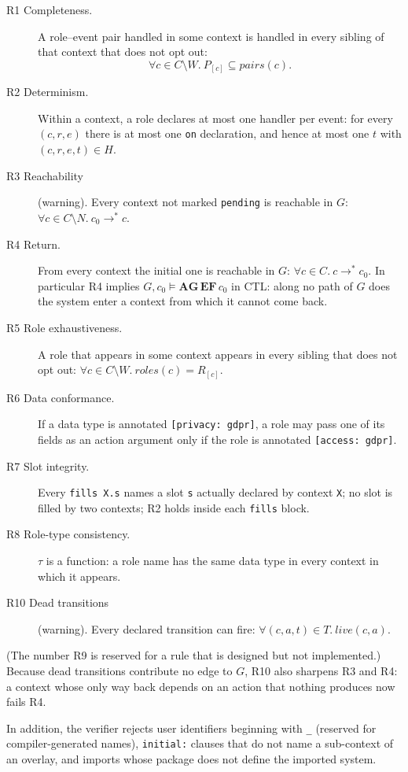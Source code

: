 \begin{description}
\item[R1 Completeness.] A role--event pair handled in some context is
  handled in every sibling of that context that does not opt out:
  \[ \forall c \in C \setminus W.\ P_{[c]} \subseteq \mathit{pairs}(c). \]
\item[R2 Determinism.] Within a context, a role declares at most one
  handler per event: for every $(c,r,e)$ there is at most one \texttt{on}
  declaration, and hence at most one $t$ with $(c,r,e,t) \in H$.
\item[R3 Reachability] (warning). Every context not marked
  \texttt{pending} is reachable in $G$:
  $\forall c \in C \setminus N.\ c_0 \to^{*} c$.
\item[R4 Return.] From every context the initial one is reachable in $G$:
  $\forall c \in C.\ c \to^{*} c_0$. In particular R4 implies
  $G, c_0 \models \mathbf{AG}\,\mathbf{EF}\, c_0$ in CTL: along no path
  of $G$ does the system enter a context from which it cannot come back.
\item[R5 Role exhaustiveness.] A role that appears in some context
  appears in every sibling that does not opt out:
  $\forall c \in C \setminus W.\ \mathit{roles}(c) = R_{[c]}$.
\item[R6 Data conformance.] If a data type is annotated
  \texttt{[privacy: gdpr]}, a role may pass one of its fields as an action
  argument only if the role is annotated \texttt{[access: gdpr]}.
\item[R7 Slot integrity.] Every \texttt{fills X.s} names a slot \texttt{s}
  actually declared by context \texttt{X}; no slot is filled by two
  contexts; R2 holds inside each \texttt{fills} block.
\item[R8 Role-type consistency.] $\tau$ is a function: a role name has the
  same data type in every context in which it appears.
\item[R10 Dead transitions] (warning). Every declared transition can fire:
  $\forall (c,a,t) \in T.\ \mathit{live}(c,a)$.
\end{description}
(The number R9 is reserved for a rule that is designed but not implemented.)
Because dead transitions contribute no edge to $G$, R10 also sharpens R3
and R4: a context whose only way back depends on an action that nothing
produces now fails R4.

In addition, the verifier rejects user identifiers beginning with
\texttt{\_} (reserved for compiler-generated names), \texttt{initial:}
clauses that do not name a sub-context of an overlay, and imports whose
package does not define the imported system.

